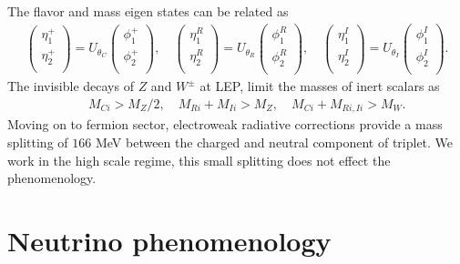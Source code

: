 \documentclass[aps, a4paper,superscriptaddress,12pt,preprintnumbers,floatfix,nofootinbib,amsmath,amssymb]{revtex4}
\begin{document}
The flavor and mass eigen states can be related as
\begin{align}
	\begin{pmatrix}
		 \eta^+_1\\
		 \eta^+_2\\
	\end{pmatrix} =
	U_{\theta_C}
		\begin{pmatrix}
		 \phi^+_1\\
		 \phi^+_2\\
	\end{pmatrix}, \quad
	\begin{pmatrix}
		 \eta^R_1\\
		 \eta^R_2\\
	\end{pmatrix} =
	U_{\theta_R}		\begin{pmatrix}
		 \phi^R_1\\
		 \phi^R_2\\
	\end{pmatrix}, \quad
	\begin{pmatrix}
		 \eta^I_1\\
		 \eta^I_2\\
	\end{pmatrix} =
	U_{\theta_I}		\begin{pmatrix}
		 \phi^I_1\\
		 \phi^I_2\\
	\end{pmatrix}.
\end{align}
The invisible decays of $Z$ and $W^\pm$ at LEP, limit the masses of inert scalars as \cite{Cao:2007rm,Lundstrom:2008ai}
\begin{eqnarray}
&&    M_{Ci} > M_Z/2, \quad M_{Ri} + M_{Ii} > M_Z, \quad M_{Ci} + M_{Ri, Ii} > M_{W}.
\end{eqnarray}
Moving on to fermion sector, electroweak radiative corrections provide a mass splitting of $166$ MeV \cite{Cirelli:2005uq} between the charged and neutral component of triplet. We work in the high scale regime, this small splitting does not effect the phenomenology. 
%
\section{Neutrino phenomenology}
\end{document}
